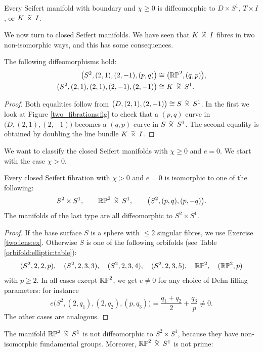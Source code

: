 \begin{cor}
Every Seifert manifold with boundary and $\chi\geqslant 0$ is diffeomorphic to $D\times S^1$, $T\times I$, or $K\timtil I$.
\end{cor}

We now turn to closed Seifert manifolds. We have seen that $K\timtil I$ fibres in two non-isomorphic ways, and this has some consequences.

\begin{cor} \label{Seifert:diffeo:cor}
The following diffeomorphisms hold:
\begin{align*}
\big(S^2,(2,1),(2,-1),(p,q)\big) & \isom \big(\matRP^2, (q,p)\big), \\
\big(S^2,(2,1),(2,1),(2,-1),(2,-1)\big) & \isom K\timtil S^1.
\end{align*}
\end{cor}
\begin{proof}
Both equalities follow from $\big(D, (2,1), (2,-1)\big) \isom S\timtil S^1$. In the first we look at Figure \ref{two_fibrations:fig} to check that a $(p,q)$ curve in $\big(D,(2,1),(2,-1)\big)$ becomes a $(q,p)$ curve in $S\timtil S^1$.
The second equality is obtained by doubling the line bundle $K\timtil I$.
\end{proof}

We want to classify the closed Seifert manifolds with $\chi\geqslant 0$ and $e=0$. We start with the case $\chi >0$.

\begin{prop} \label{rp:prop}
Every closed Seifert fibration with $\chi>0$ and $e=0$ is isomorphic to one of the following: 
$$S^2 \times S^1, \qquad \matRP^2 \timtil S^1, \qquad \big(S^2, (p,q), (p,-q)\big).$$
The manifolds of the last type are all diffeomorphic to $S^2\times S^1$.
\end{prop}
\begin{proof}
If the base surface $S$ is a sphere with $\leqslant 2$ singular fibres, we use Exercise \ref{two:lens:ex}. Otherwise $S$ is one of the following orbifolds (see Table \ref{orbifold:elliptic:table}):
$$(S^2,2,2,p), \quad (S^2,2,3,3), \quad (S^2,2,3,4), \quad (S^2,2,3,5), \quad \mathbb{RP}^2, \quad (\mathbb{RP}^2, p) $$
with $p\geqslant 2$. In all cases except $\mathbb{RP}^2$, we get $e\neq 0$ for any choice of Dehn filling parameters: for instance 
$$e\big(S^2,(2,q_1),(2,q_2),(p,q_3)\big) = \frac{q_1+q_2}2 + \frac{q_3}p \neq 0.$$ 
The other cases are analogous.
\end{proof}

The manifold $\matRP^2 \timtil S^1$ is not diffeomorphic to $S^2\times S^1$, because they have non-isomorphic fundamental groups. Moreover, $\matRP^2 \timtil S^1$ is not prime:

